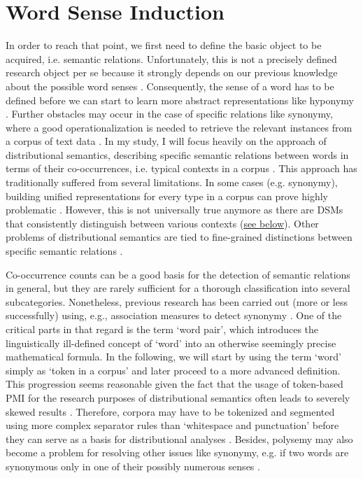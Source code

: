 \documentclass[oneside]{book}
\begin{document}
\section{Word Sense Induction}
\label{polysemyProblemForSemanticRelations}
In order to reach that point, we first need to define the basic object to be acquired, i.e. semantic relations. Unfortunately, this is not a precisely defined research object per se because it strongly depends on our previous knowledge about the possible word senses \parencite[12]{ayseExtractionSemanticWord2011}. Consequently, the sense of a word has to be defined before we can start to learn more abstract representations like hyponymy \parencite[137]{bartunovBreakingSticksAmbiguities2016}. Further obstacles may occur in the case of specific relations like synonymy, where a good operationalization is needed to retrieve the relevant instances from a corpus of text data \parencite[274]{divjakCorpusbasedCognitiveSemantics2009}. In my study, I will focus heavily on the approach of distributional semantics, describing specific semantic relations between words in terms of their co-occurrences, i.e. typical contexts in a corpus \parencites[162]{harrisDistributionalStructure1954}[30]{firthSynopsisLinguisticTheory1957}. This approach has traditionally suffered from several limitations. In some cases (e.g. synonymy), building unified representations for every type in a corpus can prove highly problematic \parencite[114]{karanDistributionalSemanticsApproach2012}. However, this is not universally true anymore as there are \gls{DSM}s that consistently distinguish between various contexts (\hyperlink{ELMO}{see below}). Other problems of distributional semantics are tied to fine-grained distinctions between specific semantic relations \parencite[115]{karanDistributionalSemanticsApproach2012}.

Co-occurrence counts can be a good basis for the detection of semantic relations in general, but they are rarely sufficient for a thorough classification into several subcategories. Nonetheless, previous research has been carried out (more or less successfully) using, e.g., association measures to detect synonymy \parencite[566]{hagiwaraSupervisedSynonymAcquisition2009}. One of the critical parts in that regard is the term `word pair', which introduces the linguistically ill-defined concept of `word' into an otherwise seemingly precise mathematical formula. In the following, we will start by using the term `word' simply as `token in a corpus' and later proceed to a more advanced definition. This progression seems reasonable given the fact that the usage of token-based \gls{PMI} for the research purposes of distributional semantics often leads to severely skewed results \parencite[444]{herbelotMeasuringSemanticContent2013}. Therefore, corpora may have to be tokenized and segmented using more complex separator rules than `whitespace and punctuation' before they can serve as a basis for distributional analyses \parencite[6]{mikolovDistributedRepresentationsWords2013}. Besides, polysemy may also become a problem for resolving other issues like synonymy, e.g. if two words are synonymous only in one of their possibly numerous senses \parencite[444]{herbelotMeasuringSemanticContent2013}. 
\end{document}
